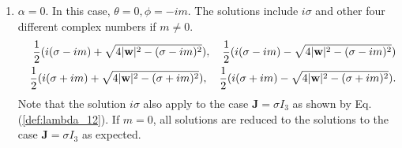 \documentclass[10pt,reqno]{amsart}
\renewcommand{\(}{\left(}
\renewcommand{\)}{\right)}
\newcommand{\bw}{{\bf w}}
\newcommand{\bJ}{\mathbf{J}}
\newtheorem{lem}[theo]{Lemma}
\numberwithin{equation}{section}
\begin{document}
\begin{enumerate}
\begin{lem}
\begin{enumerate}
	\item The unique real solution of Eq. (\ref{eq:y}) with multiplicity $3$ occurs at  $y_1=y_2=y_3=\frac{\sqrt 6}{2} |\bw|$ when $\sigma=\frac{3\sqrt6}{2}|\bw|$ and $m=\frac{\sqrt 2}{4}|\bw|$. 
	\item The unique real solution of Eq. (\ref{eq:y}) with multiplicity $2$ occurs at $\hat y := \frac{9|\bw|^2-2\tau}{2(3\tau - 4\sigma^2)} \sigma$ when $3\tau - 4\sigma^2>0$ and $g(\hat y) = g'(\hat y)=0$.
	\item In other cases, there are three different solutions $y_1,y_2,y_3$ such that $y_1$ is real and $0<y_1<\sigma$. Furthermore, if $y_2, y_3 $ are complex, then $y_3 = \bar{y_2}$.
\end{enumerate}
\end{lem}
\item $\alpha=0$.  In this case, $\theta=0, \phi = -im $.  The solutions include $i\sigma$ and other four different complex numbers if $m \neq 0$. 
\begin{eqnarray*}
& & \frac12 (i(\sigma-im) + \sqrt{4|\bw|^2 - (\sigma-im)^2}), \quad \frac12 (i(\sigma-im) - \sqrt{4|\bw|^2 - (\sigma-im)^2})\\
& & \frac12 (i(\sigma +im) + \sqrt{4|\bw|^2 - (\sigma+im)^2}), \quad \frac12 (i(\sigma +im) - \sqrt{4|\bw|^2 - (\sigma+im)^2}).
\end{eqnarray*}
Note that the solution $i\sigma$ also apply to the case $\bJ = \sigma I_3$ as shown by Eq. (\ref{def:lambda_12}).   If $m=0$,  all solutions are reduced to the solutions to the case $\bJ=\sigma I_3$ as expected.
\end{enumerate}
\end{document}
